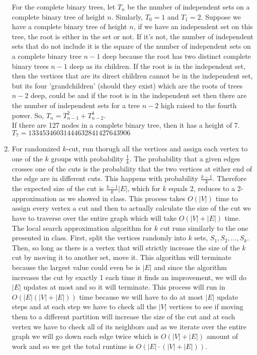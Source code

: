 \documentclass{article}
\begin{document}
\begin{enumerate}
	For the complete binary trees, let $T_n$ be the number of independent sets on a complete binary tree of height $n$. Simlarly, $T_0 = 1$ and $T_1 = 2$. Suppose we have a complete binary tree of height $n$, if we have an independent set on this tree, the root is either in the set or not.  If it's not, the number of independent sets that do not include it is the square of the number of independent sets on a complete binary tree $n-1$ deep because the root has two distinct complete binary trees $n-1$ deep as its children.  If the root is in the independent set, then the vertices that are its direct children cannot be in the independent set, but its four 'grandchildren' (should they exist) which are the roots of trees $n-2$ deep, could be and if the root is in the independent set then there are the number of independent sets for a tree $n-2$ high raised to the fourth power.  So, $T_n = T_{n-1}^2+T_{n-2}^4$.  \\
	
	If there are 127 nodes in a complete binary tree, then it has a height of 7. \\
	 $T_7 = 13345346031444632841427643906$
	
	\item For randomized $k$-cut, run thorugh all the vertices and assign each vertex to one of the $k$ groups with probability $\frac{1}{k}$.  The probability that a given edges crosses one of the cuts is the probability that the two vertices at either end of the edge are in different cuts.  This happens with probability $\frac{k-1}{k}$.  Therefore the expected size of the cut is $\frac{k-1}{k}|E|$, which for $k$ equals 2, reduces to a 2-approximation as we showed in class.  This process takes $O(|V|)$ time to assign every vertex a cut and then to actually calculate the size of the cut we have to traverse over the entire graph which will take $O(|V|+|E|)$ time.  \\
	
	The local search approximation algorithm for $k$ cut runs similarly to the one presented in class.  First, split the vertices randomly into $k$ sets, $S_1, S_2, ..., S_k$.  Then, so long as there is a vertex that will strictly increase the size of the $k$ cut by moving it to another set, move it.  This algorithm will terminate because the largest value could even be is $|E|$ and since the algorithm increases the cut by exactly 1 each time it finds an improvement, we will do $|E|$ updates at most and so it will terminate. This process will run in $O(|E|(|V|+|E|))$ time because we will have to do at most $|E|$ update steps and at each step we have to check all the $|V|$ vertices to see if moving them to a different partition will increase the size of the cut and at each vertex we have to check all of its neighbors and as we iterate over the entire graph we will go down each edge twice which is $O(|V|+|E|)$ amount of work and so we get the total runtime is $O(|E|\cdot(|V|+|E|))$.  \\
	

\end{enumerate}
\end{document}
